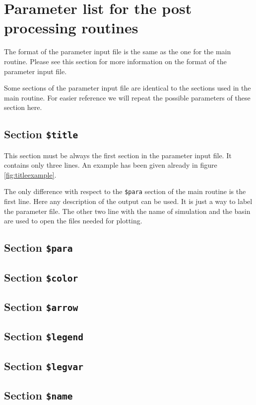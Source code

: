 \documentclass{report}
\begin{document}
\section{Parameter list for the post processing routines}

The format of the parameter input file is the same as the one for
the main routine. Please see this section for more information
on the format of the parameter input file.

Some sections of the parameter input file are identical to the 
sections used in the main routine. For easier reference we will
repeat the possible parameters of these section here.


\subsection{Section {\tt \$title}}

This section must be always the first section in the parameter input file.
It contains only three lines. An example has been given already in 
figure \ref{fig:titleexample}.

The only difference with respect to the {\tt \$para} section of the main
routine is the first line. Here any description of the output can be used.
It is just a way to label the parameter file.  The other two line with
the name of simulation and the basin are used to open the files needed
for plotting.


\subsection{Section {\tt \$para}}


\subsection{Section {\tt \$color}}


\subsection{Section {\tt \$arrow}}


\subsection{Section {\tt \$legend}}


\subsection{Section {\tt \$legvar}}


\subsection{Section {\tt \$name}}




\end{document}
